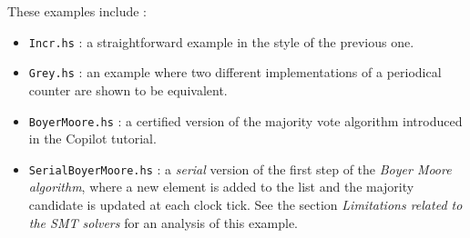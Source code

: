 These examples include :

\begin{itemize}
\itemsep1pt\parskip0pt
\item
  \texttt{Incr.hs} : a straightforward example in the style of the
  previous one.
\item
  \texttt{Grey.hs} : an example where two different implementations of a
  periodical counter are shown to be equivalent.
\item
  \texttt{BoyerMoore.hs} : a certified version of the majority vote
  algorithm introduced in the Copilot tutorial.
\item
  \texttt{SerialBoyerMoore.hs} : a \emph{serial} version of the first
  step of the \emph{Boyer Moore algorithm}, where a new element is added
  to the list and the majority candidate is updated at each clock tick.
  See the section \emph{Limitations related to the SMT solvers} for an
  analysis of this example.
\end{itemize}

